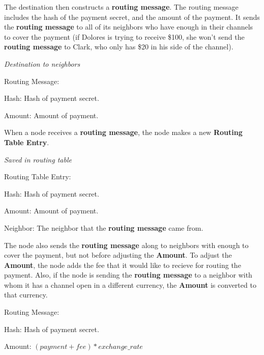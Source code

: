 \documentclass[a4paper]{article}
\newcommand{\bgls}[1]{\textbf{\gls{#1}}}
\newenvironment{mydescription}
{\begin{description}
  \setlength{\itemsep}{5pt}
    \setlength{\parskip}{0pt}
    \setlength{\labelsep}{5pt}
}{
\end{description}}
\begin{document}
The destination then constructs a \bgls{routing message}. The routing message includes the hash of the payment secret, and the amount of the payment. It sends the \bgls{routing message} to all of its neighbors who have enough in their channels to cover the payment (if Dolores is trying to receive \$100, she won't send the \bgls{routing message} to Clark, who only has \$20 in his side of the channel).

\begin{mdframed}[style=message]{\emph{Destination to neighbors}}
\begin{mydescription}
  \item[Routing Message:] \hfill
  \begin{mydescription}
    \item[Hash:] Hash of payment secret.
    \item[Amount:] Amount of payment.
  \end{mydescription}
\end{mydescription}
\end{mdframed}

When a node receives a \bgls{routing message}, the node makes a new \textbf{Routing Table Entry}.

\begin{mdframed}[style=message]{\emph{Saved in routing table}}
\begin{mydescription}
  \item[Routing Table Entry:] \hfill
  \begin{mydescription}
    \item[Hash:] Hash of payment secret.
    \item[Amount:] Amount of payment.
    \item[Neighbor:] The neighbor that the \bgls{routing message} came from.
  \end{mydescription}
\end{mydescription}
\end{mdframed}

The node also sends the \bgls{routing message} along to neighbors with enough to cover the payment, but not before adjusting the \textbf{Amount}. To adjust the \textbf{Amount}, the node adds the fee that it would like to recieve for routing the payment. Also, if the node is sending the \bgls{routing message} to a neighbor with whom it has a channel open in a different currency, the \textbf{Amount} is converted to that currency.

\begin{mdframed}[style=message]
\begin{mydescription}
  \item[Routing Message:] \hfill
  \begin{mydescription}
    \item[Hash:] Hash of payment secret.
    \item[Amount:]   $(payment + fee) * exchange\_rate$
  \end{mydescription}
\end{mydescription}
\end{mdframed}
\end{document}
